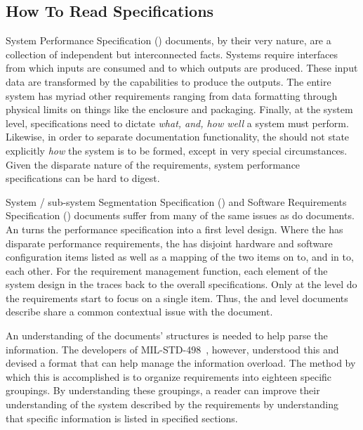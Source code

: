 
\subsection{How To Read Specifications}
\label{ssec:Intro_HowToRead}

System Performance Specification (\SPS) documents, by their very nature, are a collection of independent but interconnected facts.
Systems require interfaces from which inputs are consumed and to which outputs are produced.
These input data are transformed by the capabilities to produce the outputs.
The entire system has myriad other requirements ranging from data formatting through physical limits on things like the enclosure and packaging.
Finally, at the system level, specifications need to dictate {\em what, and, how well} a system must perform.
Likewise, in order to separate documentation functionality, the \SPS should not state explicitly {\em how} the system is to be formed, except in very special circumstances.
Given the disparate nature of the requirements, system performance specifications can be hard to digest.


System / sub-system Segmentation Specification (\SSS) and Software Requirements Specification (\SRS) documents suffer from many of the same issues as do \SPS documents.
An \SSS turns the performance specification into a first level design.
Where the \SPS has disparate performance requirements, the \SSS has disjoint hardware and software configuration items listed as well as a mapping of the two items on to, and in to, each other.
For the requirement management function, each element of the system design in the \SSS traces back to the overall \SPS specifications.
Only at the \SRS level do the requirements start to focus on a single item.
Thus, the \SSS and \SRS level documents describe share a common contextual issue with the \SPS document.


An understanding of the documents' structures is needed to help parse the information.
The developers of MIL-STD-498~\cite{ref__MIL_STD_498}, however, understood this and devised a format that can help manage the information overload.
The method by which this is accomplished is to organize requirements into eighteen specific groupings.
By understanding these groupings, a reader can improve their understanding of the system described by the requirements by understanding that specific information is listed in specified sections.


